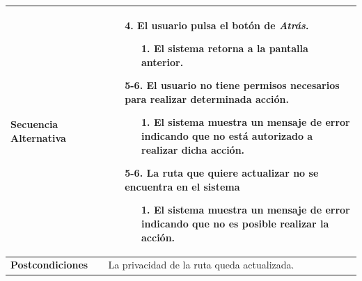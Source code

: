\begin{longtable}{| p{4cm} | p{10cm} |}
\hline
\textbf{Secuencia Alternativa} &\mbox{}\par\vspace{-\baselineskip}
\begin{enumerate}[leftmargin=0.9cm, topsep=0.1cm]
\item[4.] El usuario pulsa el botón de \textit{Atrás}.
	\begin{itemize}
	\item[1.] El sistema retorna a la pantalla anterior.
	\end{itemize}
\item[5-6.] El usuario no tiene permisos necesarios para realizar determinada acción.
	\begin{itemize}
	\item[1.] El sistema muestra un mensaje de error indicando que no está autorizado a realizar dicha acción.
	\end{itemize}
\item[5-6.] La ruta que quiere actualizar no se encuentra en el sistema
	\begin{itemize}
	\item[1.] El sistema muestra un mensaje de error indicando que no es posible realizar la acción.
	\end{itemize}
\end{enumerate}
\\

\hline
\textbf{Postcondiciones} & 
La privacidad de la ruta queda actualizada.\\
\hline
\end{longtable}



\newpage
